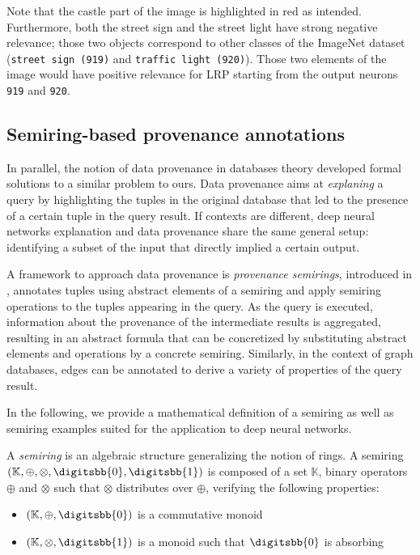 \documentclass[twocolumn]{../cs-classes/cs-classes}
\newcommand*{\K}{\mathbb{K}}
\newcommand*{\1}{\digitsbb{1}}
\newcommand*{\0}{\digitsbb{0}}
\begin{document}
Note that the castle part of the image is highlighted in red as intended. Furthermore, both the street sign and the street light have strong negative relevance; those two objects correspond to other classes of the ImageNet dataset (\texttt{street sign (919)} and \texttt{traffic light (920)}). Those two elements of the image would have positive relevance for LRP starting from the output neurons \texttt{919} and \texttt{920}.

\subsection{Semiring-based provenance annotations}
In parallel, the notion of data provenance in databases theory developed formal solutions to a similar problem to ours. Data provenance aims at \emph{explaning} a query by highlighting the tuples in the original database that led to the presence of a certain tuple in the query result. If contexts are different, deep neural networks explanation and data provenance share the same general setup: identifying a subset of the input that directly implied a certain output.

A framework to approach data provenance is \emph{provenance semirings}, introduced in \cite{green-2007}, annotates tuples using abstract elements of a semiring and apply semiring operations to the tuples appearing in the query. As the query is executed, information about the provenance of the intermediate results is aggregated, resulting in an abstract formula that can be concretized by substituting abstract elements and operations by a concrete semiring. Similarly, in the context of graph databases, edges can be annotated to derive a variety of properties of the query result. \cite{ramusat-prov}

In the following, we provide a mathematical definition of a semiring as well as semiring examples suited for the application to deep neural networks.

\begin{definition}[Semiring]
    A \emph{semiring} is an algebraic structure generalizing the notion of rings. A semiring $(\K, \oplus, \otimes, \0, \1)$ is composed of a set $\K$, binary operators $\oplus$ and $\otimes$ such that $\otimes$ distributes over $\oplus$, verifying the following properties:
    \begin{itemize}
        \item $(\K, \oplus, \0)$ is a commutative monoid
        \item $(\K, \otimes, \1)$ is a monoid such that $\0$ is absorbing
    \end{itemize}
\end{definition}
\end{document}
